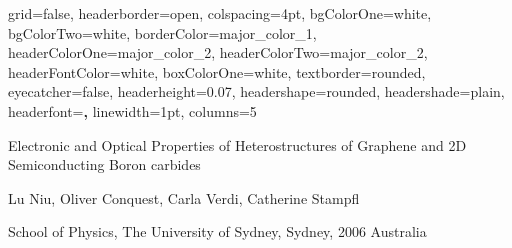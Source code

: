 \documentclass[a0paper,portrait]{baposter}
\begin{document}

\begin{poster}
{
    grid=false,
    headerborder=open,      %
    colspacing=4pt,         %
    bgColorOne=white,
    bgColorTwo=white,
    borderColor=major_color_1,    %
    headerColorOne=major_color_2,
    headerColorTwo=major_color_2,
    headerFontColor=white,
    boxColorOne=white,
    textborder=rounded,
    eyecatcher=false,
    headerheight=0.07\textheight,
    headershape=rounded,
    headershade=plain,
    headerfont=\large\textbf,
    linewidth=1pt,
    columns=5
}{}
{
    \vspace{20pt}
    \begin{center}\begin{minipage}{500pt}
        \Large{Electronic and Optical Properties of Heterostructures of Graphene and 2D Semiconducting Boron carbides}
        \begin{center}
            \par\vspace{-5pt}\large{Lu Niu, Oliver Conquest, Carla Verdi, Catherine Stampfl}
            \par{School of Physics, The University of Sydney, Sydney, 2006 Australia}
        \end{center}
    \end{minipage}
    \begin{minipage}{60pt}

\end{minipage}
\end{center}}
\end{poster}
\end{document}
